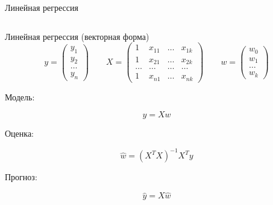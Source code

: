 \documentclass[notes,12pt, aspectratio=169]{beamer}
\begin{document}
\begin{frame}{Линейная регрессия}
\begin{columns}[T]
\end{columns}
\end{frame}



\begin{frame}{Линейная регрессия (векторная форма)}
\[
y = \begin{pmatrix} y_1 \\ y_2 \\ \ldots \\ y_n \end{pmatrix}  \qquad X = \begin{pmatrix} 1 & x_{11} & \ldots & x_{1k} \\ 1 & x_{21} & \ldots & x_{2k} \\ \ldots & \ldots & \ldots & \dots \\ 1 & x_{n1} & \ldots & x_{nk} \end{pmatrix}  \qquad  w = \begin{pmatrix} w_0 \\ w_1 \\ \ldots \\ w_k \end{pmatrix} 
\]

Модель: 

\[ 
y = Xw
\]

Оценка: 

\[
\hat w = (X^T X)^{-1} X^T y
\]

Прогноз: 

\[
\hat y = X \hat{w}
\]
\end{frame}
\end{document}
